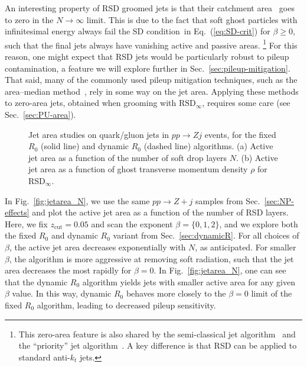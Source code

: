 \documentclass[11pt,a4paper]{article}
\newcommand{\zcut}{z_\text{cut}}
\newcommand{\RSDinf}{\text{RSD}_\infty}
\DeclareRobustCommand{\Sec}[1]{Sec.~\ref{#1}}
\DeclareRobustCommand{\Fig}[1]{Fig.~\ref{#1}}
\DeclareRobustCommand{\Eq}[1]{Eq.~(\ref{#1})}
\begin{document}
An interesting property of RSD groomed jets is that their catchment
area~\cite{Cacciari:2008gn} goes to zero in the $N \to \infty$
limit.
%
This is due to the fact that soft ghost particles with infinitesimal energy always fail the SD
condition~in \Eq{eq:SD-crit} for $\beta \geq 0$, such that the final
jets always have vanishing active and passive areas.%
\footnote{This zero-area feature is also shared by the semi-classical
  jet algorithm~\cite{Tseng:2013dva} and the ``priority'' jet
  algorithm~\cite{Duffty:2016dlg}.  A key difference is that RSD can
  be applied to standard anti-$k_t$ jets.}
%
For this reason, one might expect that RSD jets would be particularly
robust to pileup contamination, a feature we will explore further in
\Sec{sec:pileup-mitigation}.
%
That said, many of the commonly used pileup mitigation techniques,
such as the area--median method~\cite{Cacciari:2007fd,Cacciari:2008gn},
rely in some way on the jet area.
%
Applying these methods to zero-area jets, obtained when grooming with
$\RSDinf$, requires some care (see \Sec{sec:PU-area}).


\begin{figure}
  \centering
  \qquad
  \caption{Jet area studies on quark/gluon jets in $pp \to Zj$ events, for the fixed $R_0$ (solid line) and dynamic $R_0$
    (dashed line) algorithms.  (a) Active jet area as a function of the number of soft drop layers $N$.  (b) Active jet area as a function of
    ghost transverse momentum density $\rho$ for RSD$_\infty$.
    }
  \label{fig:jetarea}
\end{figure}

In \Fig{fig:jetarea_N}, we use the same $pp\rightarrow Z+j$ samples from \Sec{sec:NP-effects} and plot the active jet area as a
function of the number of RSD layers.
%
Here, we fix $\zcut = 0.05$ and scan the exponent $\beta = \{0,1,2\}$, and we explore both the fixed $R_0$ and dynamic $R_0$
variant from \Sec{sec:dynamicR}.
%
For all choices of $\beta$, the active jet area decreases exponentially with
$N$, as anticipated. 
%
For smaller $\beta$, the algorithm is more aggressive at
removing soft radiation, such that the jet area decreases the most rapidly for
$\beta=0$.
%
In \Fig{fig:jetarea_N}, one can see that the dynamic $R_0$
algorithm yields jets with smaller active area for any given $\beta$
value.
%
In this way, dynamic $R_0$ behaves more closely to the $\beta=0$
limit of the fixed $R_0$ algorithm, leading to decreased pileup
sensitivity.
\end{document}

